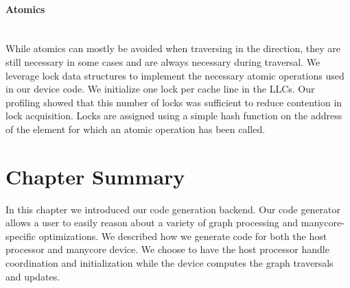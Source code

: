 \paragraph{Atomics}\mbox{}\\
While atomics can mostly be avoided when traversing in the \pull direction, they are still necessary in some cases and are always necessary during \push traversal.
We leverage lock data structures to implement the necessary atomic operations used in our device code.
We initialize one lock per cache line in the LLCs.
Our profiling showed that this number of locks was sufficient to reduce contention in lock acquisition.
Locks are assigned using a simple hash function on the address of the element for which an atomic operation has been called.

\section{Chapter Summary}
In this chapter we introduced our \hb code generation backend.
Our code generator allows a user to easily reason about a variety of graph processing and manycore-specific optimizations.
We described how we generate code for both the host processor and manycore device. 
We choose to have the host processor handle coordination and initialization while the device computes the graph traversals and updates.